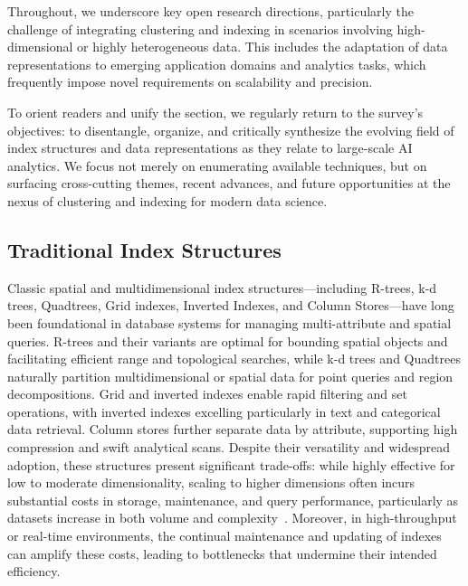 \documentclass[sigconf]{acmart}
\begin{document}
Throughout, we underscore key open research directions, particularly the challenge of integrating clustering and indexing in scenarios involving high-dimensional or highly heterogeneous data. This includes the adaptation of data representations to emerging application domains and analytics tasks, which frequently impose novel requirements on scalability and precision.

To orient readers and unify the section, we regularly return to the survey’s objectives: to disentangle, organize, and critically synthesize the evolving field of index structures and data representations as they relate to large-scale AI analytics. We focus not merely on enumerating available techniques, but on surfacing cross-cutting themes, recent advances, and future opportunities at the nexus of clustering and indexing for modern data science.


\subsection{Traditional Index Structures}

Classic spatial and multidimensional index structures—including R-trees, k-d trees, Quadtrees, Grid indexes, Inverted Indexes, and Column Stores—have long been foundational in database systems for managing multi-attribute and spatial queries. R-trees and their variants are optimal for bounding spatial objects and facilitating efficient range and topological searches, while k-d trees and Quadtrees naturally partition multidimensional or spatial data for point queries and region decompositions. Grid and inverted indexes enable rapid filtering and set operations, with inverted indexes excelling particularly in text and categorical data retrieval. Column stores further separate data by attribute, supporting high compression and swift analytical scans. Despite their versatility and widespread adoption, these structures present significant trade-offs: while highly effective for low to moderate dimensionality, scaling to higher dimensions often incurs substantial costs in storage, maintenance, and query performance, particularly as datasets increase in both volume and complexity~\cite{ref111,ref112}. Moreover, in high-throughput or real-time environments, the continual maintenance and updating of indexes can amplify these costs, leading to bottlenecks that undermine their intended efficiency.
\end{document}
